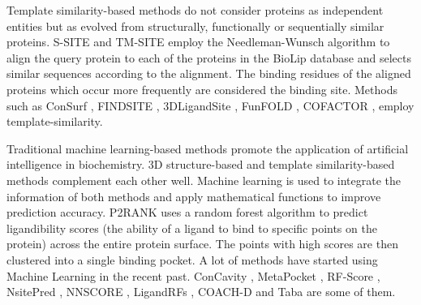 \documentclass[journal=jacsat,manuscript=article]{achemso}
\begin{document}
Template similarity-based methods do not consider proteins as independent entities but as evolved from structurally, functionally or sequentially similar proteins. S-SITE and TM-SITE \cite{yang2013protein} employ the Needleman-Wunsch algorithm to align the query protein to each of the proteins in the BioLip \cite{yang2012biolip} database and selects similar sequences according to the alignment. The binding residues of the aligned proteins which occur more frequently are considered the binding site. Methods such as ConSurf \cite{glaser2003consurf}, FINDSITE \cite{brylinski2008threading}, 3DLigandSite \cite{wass20103dligandsite}, FunFOLD \cite{roche2011funfold}, COFACTOR \cite{roy2012recognizing}, employ template-similarity.

Traditional machine learning-based methods promote the application of artificial intelligence in biochemistry. 3D structure-based and template similarity-based methods complement each other well. Machine learning is used to integrate the information of both methods and apply mathematical functions to improve prediction accuracy. P2RANK \cite{krivak2015improving} \cite{krivak2018p2rank} uses a random forest algorithm to predict ligandibility scores (the ability of a ligand to bind to specific points on the protein) across the entire protein surface. The points with high scores are then clustered into a single binding pocket. A lot of methods have started using Machine Learning in the recent past. ConCavity \cite{capra2009predicting}, MetaPocket \cite{huang2009metapocket}, RF-Score \cite{ballester2010machine}, NsitePred \cite{chen2012prediction}, NNSCORE \cite{durrant2010nnscore} \cite{durrant2011nnscore}, LigandRFs \cite{chen2014ligandrfs}, COACH-D \cite{wu2018coach} and Taba \cite{da2020taba} are some of them.
\end{document}
